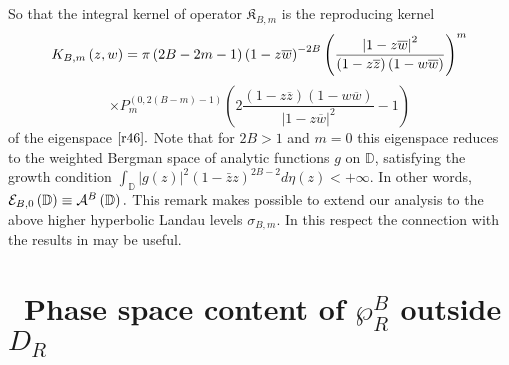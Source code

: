 So that the integral kernel of operator $\mathfrak{K}_{B,m}$ is the
reproducing kernel 
\begin{equation}
\label{r46}
K_{B,m}\left( z,w\right) =\pi \left( 2B-2m-1\right) \left( 1-z\overline{w}%
\right) ^{-2B}\left( \frac{\left\vert 1-z\overline{w}\right\vert ^{2}}{%
\left( 1-z\overline{z}\right) \left( 1-w\overline{w}\right) }\right) ^{m} 
\end{equation}
\begin{equation*}
\times P_{m}^{\left( 0,2\left( B-m\right) -1\right) }\left( 2\frac{\left( 1-z%
\overline{z}\right) \left( 1-w\overline{w}\right) }{\left\vert 1-z\overline{w%
}\right\vert ^{2}}-1\right) 
\end{equation*}
of the eigenspace $\eqref{r46}.$ Note that for $2B>1$ and $m=0$ this
eigenspace reduces to the weighted Bergman space of analytic functions $g$
on $\mathbb{D}$, satisfying the growth condition $\int_{\mathbb{D}%
}|g(z)|^{2}(1-\bar{z}z)^{2B-2}d\eta (z)<+\infty $. In other words, $\mathcal{%
E}_{B,0}\left( \mathbb{D}\right) \equiv \mathcal{A}^{B}\left( \mathbb{D}%
\right) .$ This remark makes possible to extend our analysis to the above
higher hyperbolic Landau levels $\sigma _{B,m}.$ In this respect the
connection with the results in \cite{CDM} may be useful.









\section{{\ \textbf{Phase space content of $\wp _{R}^{B}$ outside $D_{R}$}}}

